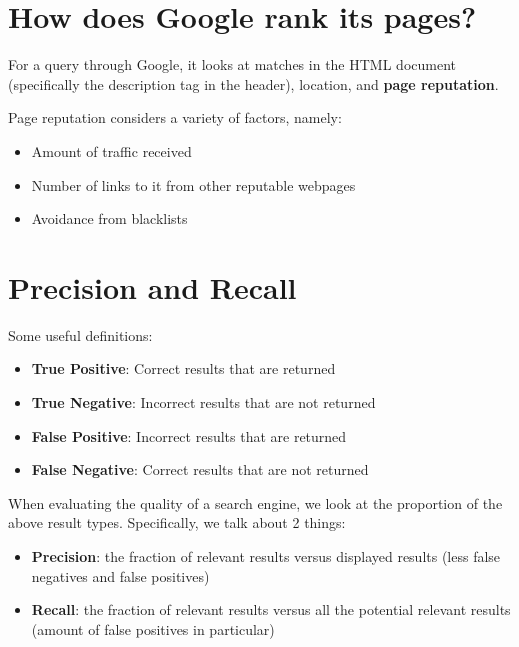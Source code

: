 \documentclass{report}
\newcommand{\npar}{\par\noindent}
\newcommand{\vpar}{\vspace{1em}\npar}
\begin{document}
\section{How does Google rank its pages?}

\par For a query through Google, it looks at matches in the HTML document (specifically the description tag in the header), location, and \textbf{page reputation}.

\vpar Page reputation considers a variety of factors, namely:

\begin{itemize}
    \item Amount of traffic received
    \item Number of links to it from other reputable webpages
    \item Avoidance from blacklists
\end{itemize}

\section{Precision and Recall}

\par Some useful definitions:

\begin{itemize}
    \item \textbf{True Positive}: Correct results that are returned
    \item \textbf{True Negative}: Incorrect results that are not returned
    \item \textbf{False Positive}: Incorrect results that are returned
    \item \textbf{False Negative}: Correct results that are not returned
\end{itemize}

\npar When evaluating the quality of a search engine, we look at the proportion of the above result types. Specifically, we talk about 2 things:

\begin{itemize}
    \item \textbf{Precision}: the fraction of relevant results versus displayed results (less false negatives and false positives)
    \item \textbf{Recall}: the fraction of relevant results versus all the potential relevant results (amount of false positives in particular)
\end{itemize}
\end{document}
